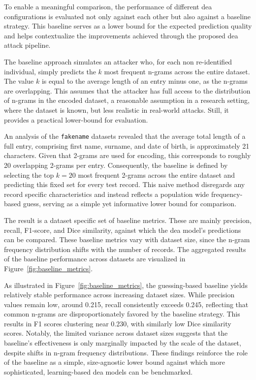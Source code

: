 To enable a meaningful comparison, the performance of different \ac{dea} configurations is evaluated not only against each other but also against a baseline strategy.
This baseline serves as a lower bound for the expected prediction quality and helps contextualize the improvements achieved through the proposed \ac{dea} attack pipeline.

The baseline approach simulates an attacker who, for each non re-identified individual, simply predicts the $k$ most frequent n-grams across the entire dataset.
The value $k$ is equal to the average length of an entry minus one, as the n-grams are overlapping.
This assumes that the attacker has full access to the distribution of n-grams in the encoded dataset, a reasonable assumption in a research setting, where the dataset is known, but less realistic in real-world attacks.
Still, it provides a practical lower-bound for evaluation.

An analysis of the \texttt{fakename} datasets revealed that the average total length of a full entry, comprising first name, surname, and date of birth, is approximately 21 characters.
Given that 2-grams are used for encoding, this corresponds to roughly 20 overlapping 2-grams per entry.
Consequently, the baseline is defined by selecting the top $k=20$ most frequent 2-grams across the entire dataset and predicting this fixed set for every test record.
This naive method disregards any record specific characteristics and instead reflects a population wide frequency-based guess, serving as a simple yet informative lower bound for comparison.

The result is a dataset specific set of baseline metrics.
These are mainly precision, recall, F1-score, and Dice similarity, against which the \ac{dea} model's predictions can be compared.
These baseline metrics vary with dataset size, since the n-gram frequency distribution shifts with the number of records.
The aggregated results of the baseline performance across datasets are visualized in Figure~\ref{fig:baseline_metrics}.

As illustrated in Figure~\ref{fig:baseline_metrics}, the guessing-based baseline yields relatively stable performance across increasing dataset sizes.
While precision values remain low, around 0.215, recall consistently exceeds 0.245, reflecting that common n-grams are disproportionately favored by the baseline strategy.
This results in F1 scores clustering near 0.230, with similarly low Dice similarity scores.
Notably, the limited variance across dataset sizes suggests that the baseline’s effectiveness is only marginally impacted by the scale of the dataset, despite shifts in n-gram frequency distributions.
These findings reinforce the role of the baseline as a simple, size-agnostic lower bound against which more sophisticated, learning-based \ac{dea} models can be benchmarked.




